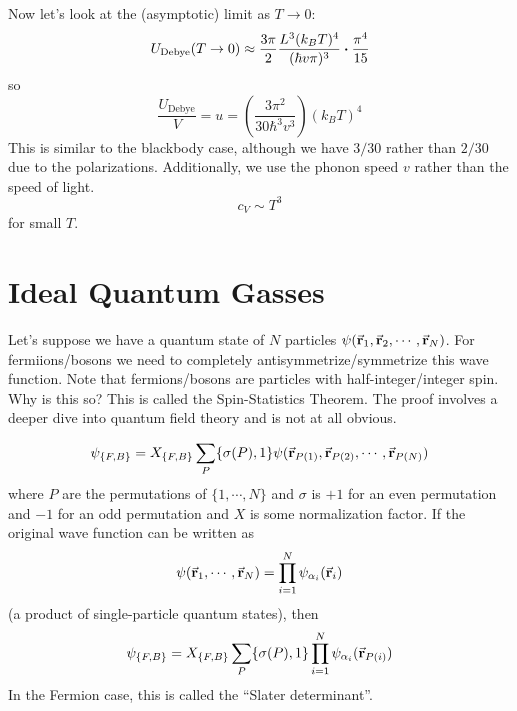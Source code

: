 \documentclass[a4paper,twoside,master.tex]{subfiles}
\begin{document}
Now let's look at the (asymptotic) limit as $ T \to 0 $:
\begin{equation}
    U_{\text{Debye}}(T \to 0) \approx \frac{3 \pi}{2} \frac{L^3(k_B T)^4}{(\hbar v \pi)^3} \vdot \frac{\pi^4}{15}
\end{equation}
so
\begin{equation}
    \frac{U_{\text{Debye}}}{V} = u = \left( \frac{3 \pi^2}{30 \hbar^3 v^3}\right) (k_B T)^4
\end{equation}
This is similar to the blackbody case, although we have $ 3/30 $ rather than $ 2/30 $ due to the polarizations. Additionally, we use the phonon speed $ v $ rather than the speed of light.
\begin{equation}
    c_V \sim T^3
\end{equation}
for small $ T $.


\section{Ideal Quantum Gasses}
\label{sec:ideal_quantum_gasses}

Let's suppose we have a quantum state of $ N $ particles $ \psi(\va{r}_1, \va{r}_2 ,\cdots, \va{r}_N) $. For fermiions/bosons we need to completely antisymmetrize/symmetrize this wave function. Note that fermions/bosons are particles with half-integer/integer spin. Why is this so? This is called the Spin-Statistics Theorem. The proof involves a deeper dive into quantum field theory and is not at all obvious.

\begin{equation}
    \psi_{\{F,B\}} = X_{\{F,B\}} \sum_P \{\sigma(P), 1\} \psi(\va{r}_{P(1)}, \va{r}_{P(2)}, \cdots, \va{r}_{P(N)})
\end{equation}
where $ P $ are the permutations of $ \{1, \cdots, N\} $ and $ \sigma $ is $ +1 $ for an even permutation and $ -1 $ for an odd permutation and $ X $ is some normalization factor. If the original wave function can be written as
\begin{equation}
    \psi(\va{r}_1, \cdots, \va{r}_N) = \prod_{i=1}^{N} \psi_{\alpha_i}(\va{r}_i)
\end{equation}
(a product of single-particle quantum states), then
\begin{equation}
    \psi_{\{F,B\}} = X_{\{F,B\}} \sum_P \{\sigma(P), 1\} \prod_{i=1}^{N} \psi_{\alpha_i}(\va{r}_{P(i)})
\end{equation}
In the Fermion case, this is called the ``Slater determinant''.
\end{document}

